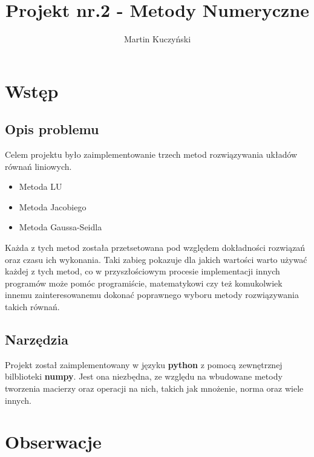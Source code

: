 \documentclass[12pt]{article}
\title{Projekt nr.2 - Metody Numeryczne}
\author{Martin Kuczyński}
\begin{document}
\maketitle
\clearpage
\section{Wstęp}
\subsection{Opis problemu}
Celem projektu było zaimplementowanie trzech metod rozwiązywania układów równań liniowych.\\
\begin{itemize}
\item Metoda LU
\item Metoda Jacobiego
\item Metoda Gaussa-Seidla
\end{itemize}
Każda z tych metod została przetsetowana pod względem dokładności rozwiązań oraz czasu ich wykonania.
Taki zabieg pokazuje dla jakich wartości warto używać każdej z tych metod, co w przyszłościowym procesie
implementacji innych programów może pomóc programiście, matematykowi czy też komukolwiek innemu zainteresowanemu
dokonać poprawnego wyboru metody rozwiązywania takich równań.
\subsection{Narzędzia}
Projekt został zaimplementowany w języku \textbf{python} z pomocą zewnętrznej bilblioteki \textbf{numpy}.
Jest ona niezbędna, ze względu na wbudowane metody tworzenia macierzy oraz operacji na nich, takich jak mnożenie, 
norma oraz wiele innych.\\
\clearpage

\section{Obserwacje}
\end{document}
